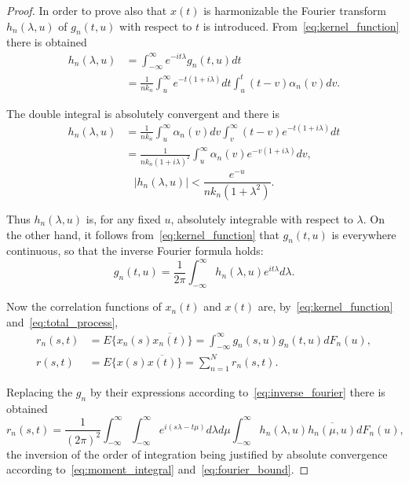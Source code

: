 \documentclass[11pt]{article}
\begin{document}
\begin{proof}
In order to prove also that $x(t)$ is harmonizable the Fourier transform $h_n(\lambda, u)$ of $g_n(t, u)$ with respect to $t$ is introduced. From~\eqref{eq:kernel_function} there is obtained
\begin{align}
h_n(\lambda, u) &= \int_{-\infty}^{\infty} e^{-it\lambda} g_n(t, u) dt \nonumber \\
&= \frac{1}{nk_n} \int_u^{\infty} e^{-t(1+i\lambda)} dt \int_u^t (t-v) \alpha_n(v) dv. \label{eq:fourier_transform_step}
\end{align}

The double integral is absolutely convergent and there is
\begin{align}
h_n(\lambda, u) &= \frac{1}{nk_n} \int_u^{\infty} \alpha_n(v) dv \int_v^{\infty} (t-v) e^{-t(1+i\lambda)} dt \nonumber \\
&= \frac{1}{nk_n(1+i\lambda)^2} \int_u^{\infty} \alpha_n(v) e^{-v(1+i\lambda)} dv, \label{eq:fourier_transform}
\end{align}
\begin{equation}
|h_n(\lambda, u)| < \frac{e^{-u}}{nk_n(1+\lambda^2)}.
\label{eq:fourier_bound}
\end{equation}

Thus $h_n(\lambda, u)$ is, for any fixed $u$, absolutely integrable with respect to $\lambda$. On the other hand, it follows from~\eqref{eq:kernel_function} that $g_n(t, u)$ is everywhere continuous, so that the inverse Fourier formula holds:
\begin{equation}
g_n(t, u) = \frac{1}{2\pi} \int_{-\infty}^{\infty} h_n(\lambda, u) e^{it\lambda} d\lambda.
\label{eq:inverse_fourier}
\end{equation}

Now the correlation functions of $x_n(t)$ and $x(t)$ are, by~\eqref{eq:kernel_function} and~\eqref{eq:total_process},
\begin{align}
r_n(s, t) &= E\{x_n(s) \overline{x_n(t)}\} = \int_{-\infty}^{\infty} g_n(s, u) g_n(t, u) dF_n(u), \label{eq:component_correlation}\\
r(s, t) &= E\{x(s) \overline{x(t)}\} = \sum_{n=1}^N r_n(s, t). \label{eq:total_correlation}
\end{align}

Replacing the $g_n$ by their expressions according to~\eqref{eq:inverse_fourier} there is obtained
\begin{equation}
r_n(s, t) = \frac{1}{(2\pi)^2} \int_{-\infty}^{\infty} \int_{-\infty}^{\infty} e^{i(s\lambda - t\mu)} d\lambda d\mu \int_{-\infty}^{\infty} h_n(\lambda, u) \overline{h_n(\mu, u)} dF_n(u),
\label{eq:fourier_correlation}
\end{equation}
the inversion of the order of integration being justified by absolute convergence according to~\eqref{eq:moment_integral} and~\eqref{eq:fourier_bound}.


\end{proof}
\end{document}
